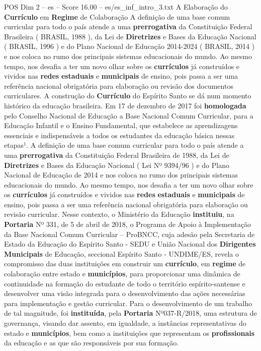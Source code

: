 \begin{textsample}{POS Dim 2 – es – Score 16.00 – es/es\_inf\_intro\_3.txt}  \label{ex:f2_pos_220}
A Elaboração do \textbf{Currículo} em \textbf{Regime} de Colaboração A definição de uma base comum curricular para todo o país atende a uma \textbf{prerrogativa} da Constituição Federal Brasileira ( BRASIL, 1988 ), da Lei de \textbf{Diretrizes} e Bases da Educação Nacional ( BRASIL, 1996 ) e do Plano Nacional de Educação 2014-2024 ( BRASIL, 2014 ) e nos coloca no rumo dos principais sistemas educacionais do mundo.
Ao mesmo tempo, nos desafia a ter um novo olhar sobre os \textbf{currículos} já construídos e vividos nas \textbf{redes} \textbf{estaduais} e \textbf{municipais} de ensino, pois passa a ser uma referência nacional obrigatória para elaboração ou revisão dos documentos curriculares.
A construção do \textbf{Currículo} do Espírito Santo se dá num momento histórico da educação brasileira.
Em 17 de dezembro de 2017 foi \textbf{homologada} pelo Conselho Nacional de Educação a Base Nacional Comum Curricular, para a Educação Infantil e o Ensino Fundamental, que estabelece as aprendizagens essenciais e indispensáveis a todos os estudantes da educação básica nessas etapas¹.
A definição de uma base comum curricular para todo o país atende a uma \textbf{prerrogativa} da Constituição Federal Brasileira de 1988, da Lei de \textbf{Diretrizes} e Bases da Educação Nacional ( Lei Nº 9394/96 ) e do Plano Nacional de Educação de 2014 e nos coloca no rumo dos principais sistemas educacionais do mundo.
Ao mesmo tempo, nos desafia a ter um novo olhar sobre os \textbf{currículos} já construídos e vividos nas \textbf{redes} \textbf{estaduais} e \textbf{municipais} de ensino, pois passa a ser uma referência nacional obrigatória para elaboração ou revisão curricular.
Nesse contexto, o Ministério da Educação \textbf{instituiu}, na \textbf{Portaria} Nº 331, de 5 de abril de 2018, o Programa de Apoio à Implementação da Base Nacional Comum Curricular – ProBNCC, cuja adesão pela Secretaria de Estado da Educação do Espírito Santo - SEDU e União Nacional dos \textbf{Dirigentes} \textbf{Municipais} de Educação, seccional Espírito Santo - UNDIME/ES, revela o compromisso das duas instituições em construir um \textbf{currículo}, em \textbf{regime} de colaboração entre estado e \textbf{municípios}, para proporcionar uma dinâmica de continuidade na formação do estudante de todo o território espírito-santense e desenvolver uma visão integrada para o desenvolvimento das ações necessárias para implementação e gestão curricular.
Para o desenvolvimento de um trabalho de tal magnitude, foi \textbf{instituída}, pela \textbf{Portaria} Nº037-R/2018, uma estrutura de governança, visando dar assento, em igualdade, a instâncias representativas do estado e \textbf{municípios}, bem como a instituições que representam os \textbf{profissionais} da educação e as que são responsáveis por sua formação.

\end{textsample}
